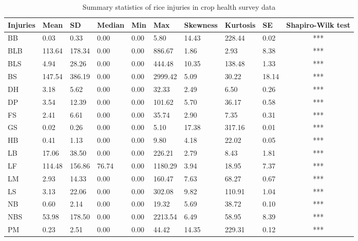 \begin{landscape}
\begin{table}[]
\centering
\caption{Summary statistics of rice injuries in crop health survey data}
\label{table:summary_injuries}
\begin{tabular}{lllllllllc}
\hline
Injuries & Mean   & SD     & Median & Min  & Max     & Skewness & Kurtosis & SE    & Shapiro-Wilk test \\
\hline
BB   & 0.03   & 0.33   & 0.00   & 0.00 & 5.80    & 14.43    & 228.44   & 0.02  & ***               \\
BLB  & 113.64 & 178.34 & 0.00   & 0.00 & 886.67  & 1.86     & 2.93     & 8.38  & ***               \\
BLS  & 4.94   & 28.26  & 0.00   & 0.00 & 444.48  & 10.35    & 138.48   & 1.33  & ***               \\
BS   & 147.54 & 386.19 & 0.00   & 0.00 & 2999.42 & 5.09     & 30.22    & 18.14 & ***               \\
DH   & 3.18   & 5.62   & 0.00   & 0.00 & 32.33   & 2.49     & 6.50     & 0.26  & ***               \\
DP   & 3.54   & 12.39  & 0.00   & 0.00 & 101.62  & 5.70     & 36.17    & 0.58  & ***               \\
FS   & 2.41   & 6.61   & 0.00   & 0.00 & 35.74   & 2.90     & 7.35     & 0.31  & ***               \\
GS   & 0.02   & 0.26   & 0.00   & 0.00 & 5.10    & 17.38    & 317.16   & 0.01  & ***               \\
HB   & 0.41   & 1.13   & 0.00   & 0.00 & 9.80    & 4.18     & 22.02    & 0.05  & ***               \\
LB   & 17.06  & 38.50  & 0.00   & 0.00 & 226.21  & 2.79     & 8.43     & 1.81  & ***               \\
LF   & 114.48 & 156.86 & 76.74  & 0.00 & 1180.29 & 3.94     & 18.95    & 7.37  & ***               \\
LM   & 2.93   & 14.33  & 0.00   & 0.00 & 160.47  & 7.63     & 68.27    & 0.67  & ***               \\
LS   & 3.13   & 22.06  & 0.00   & 0.00 & 302.08  & 9.82     & 110.91   & 1.04  & ***               \\
NB   & 0.60   & 2.14   & 0.00   & 0.00 & 19.32   & 5.69     & 38.72    & 0.10  & ***               \\
NBS  & 53.98  & 178.50 & 0.00   & 0.00 & 2213.54 & 6.49     & 58.95    & 8.39  & ***               \\
PM   & 0.23   & 2.51   & 0.00   & 0.00 & 44.42   & 14.35    & 229.31   & 0.12  & ***               \\

\end{tabular}
\end{table}
\end{landscape}
